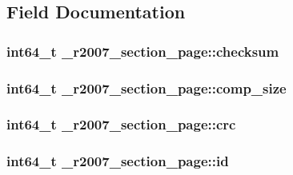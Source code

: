 \subsection{\-Field \-Documentation}
\hypertarget{struct__r2007__section__page_a32b9b77589311334eae51f2c7aee329b}{
\subsubsection[{checksum}]{\setlength{\rightskip}{0pt plus 5cm}int64\-\_\-t {\bf \-\_\-r2007\-\_\-section\-\_\-page\-::checksum}}}\label{struct__r2007__section__page_a32b9b77589311334eae51f2c7aee329b}
\hypertarget{struct__r2007__section__page_acf40138cbd9c339de46220ce541b87ea}{
\subsubsection[{comp\-\_\-size}]{\setlength{\rightskip}{0pt plus 5cm}int64\-\_\-t {\bf \-\_\-r2007\-\_\-section\-\_\-page\-::comp\-\_\-size}}}\label{struct__r2007__section__page_acf40138cbd9c339de46220ce541b87ea}
\hypertarget{struct__r2007__section__page_af946581ba943c9f54b3d847ee9c7112a}{
\subsubsection[{crc}]{\setlength{\rightskip}{0pt plus 5cm}int64\-\_\-t {\bf \-\_\-r2007\-\_\-section\-\_\-page\-::crc}}}\label{struct__r2007__section__page_af946581ba943c9f54b3d847ee9c7112a}
\hypertarget{struct__r2007__section__page_a6a302191431aef355c87c9bf94b7d015}{
\subsubsection[{id}]{\setlength{\rightskip}{0pt plus 5cm}int64\-\_\-t {\bf \-\_\-r2007\-\_\-section\-\_\-page\-::id}}}\label{struct__r2007__section__page_a6a302191431aef355c87c9bf94b7d015}
